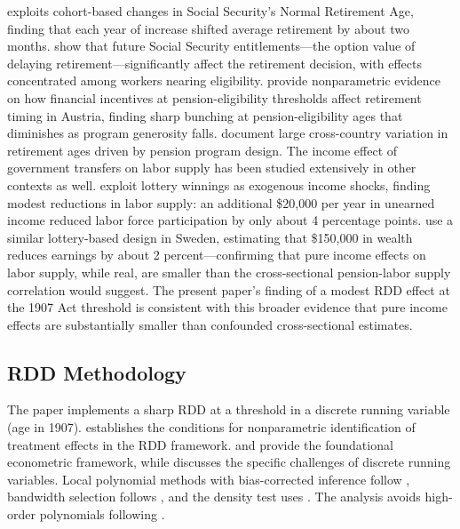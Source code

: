 \documentclass[12pt]{article}
\begin{document}
\citet{mastrobuoni2009labor} exploits cohort-based changes in Social Security's Normal Retirement Age, finding that each year of increase shifted average retirement by about two months. \citet{coile2007future} show that future Social Security entitlements---the option value of delaying retirement---significantly affect the retirement decision, with effects concentrated among workers nearing eligibility. \citet{manoli2016nonparametric} provide nonparametric evidence on how financial incentives at pension-eligibility thresholds affect retirement timing in Austria, finding sharp bunching at pension-eligibility ages that diminishes as program generosity falls. \citet{gruber1999social} document large cross-country variation in retirement ages driven by pension program design. The income effect of government transfers on labor supply has been studied extensively in other contexts as well. \citet{imbens2001estimating} exploit lottery winnings as exogenous income shocks, finding modest reductions in labor supply: an additional \$20,000 per year in unearned income reduced labor force participation by only about 4 percentage points. \citet{cesarini2017effect} use a similar lottery-based design in Sweden, estimating that \$150,000 in wealth reduces earnings by about 2 percent---confirming that pure income effects on labor supply, while real, are smaller than the cross-sectional pension-labor supply correlation would suggest. The present paper's finding of a modest RDD effect at the 1907 Act threshold is consistent with this broader evidence that pure income effects are substantially smaller than confounded cross-sectional estimates.

\subsection{RDD Methodology}

The paper implements a sharp RDD at a threshold in a discrete running variable (age in 1907). \citet{hahn2001identification} establishes the conditions for nonparametric identification of treatment effects in the RDD framework. \citet{ImbensLemieux2008} and \citet{lee2010regression} provide the foundational econometric framework, while \citet{cattaneo2020practical} discusses the specific challenges of discrete running variables. Local polynomial methods with bias-corrected inference follow \citet{calonico2014robust}, bandwidth selection follows \citet{imbens2012optimal}, and the density test uses \citet{cattaneo2020rddensity}. The analysis avoids high-order polynomials following \citet{gelman2019high}.
\end{document}
